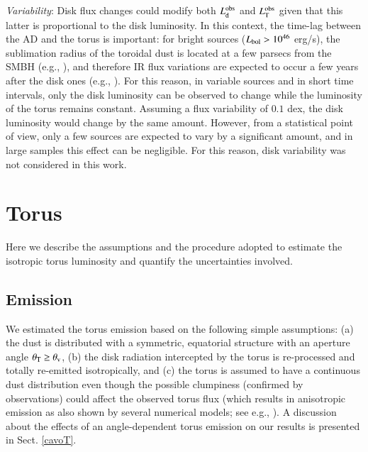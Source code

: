 \documentclass[]{aa}
\begin{document}
\textit{Variability}: Disk flux changes could modify both $L^{\rm obs}_{\rm d}$ and $L^{\rm obs}_{\rm T}$ given that this latter is proportional to the disk luminosity. In this context, the time-lag between the AD and the torus is important: for bright sources ($L_{\rm bol} > 10^{46}$ erg/s), the sublimation radius of the toroidal dust is located at a few parsecs from the SMBH (e.g., \citealt{Barva}), and therefore IR flux variations are expected to occur a few years after the disk ones (e.g., \citealt{Lyu19}). For this reason, in variable sources and in short time intervals, only the disk luminosity can be observed to change while the luminosity of the torus remains constant. Assuming a flux variability of $0.1$ dex, the disk luminosity would change by the same amount. However, from a statistical point of view, only a few sources are expected to vary by a significant amount, and in large samples this effect can be negligible. For this reason, disk variability was not considered in this work.
	











\section{Torus}\label{TORO}

Here we describe the assumptions and the procedure adopted to estimate the isotropic torus luminosity and quantify the uncertainties involved.






\subsection{Emission} \label{TORUS_struc_emis}

We estimated the torus emission based on the following simple assumptions: (a) the dust is distributed with a symmetric, equatorial structure with an aperture angle $\theta_{\rm T} \geq \theta_{\rm v}$, (b) the disk radiation intercepted by the torus is re-processed and totally re-emitted isotropically, and (c) the torus is assumed to have a continuous dust distribution even though the possible clumpiness (confirmed by observations) could affect the observed torus flux (which results in anisotropic emission as also shown by several numerical models; see e.g., \citealt{Nenka,Nenkb}). A discussion about the effects of an angle-dependent torus emission on our results is presented in Sect. \ref{cavoT}.
\end{document}
